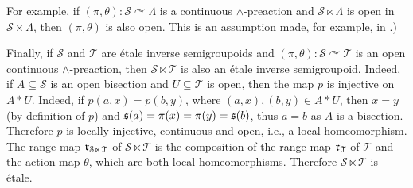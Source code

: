 For example, if $(\pi,\theta)\colon\mathcal{S}\curvearrowright\Lambda$ is a continuous $\land$-preaction and $\mathcal{S}\ltimes\Lambda$ is open in $\mathcal{S}\times\Lambda$, then $(\pi,\theta)$ is also open. This is an assumption made, for example, in \cite{MR2045419}.)

Finally, if $\mathcal{S}$ and $\mathcal{T}$ are étale inverse semigroupoids and $(\pi,\theta)\colon\mathcal{S}\curvearrowright\mathcal{T}$ is an open continuous $\land$-preaction, then $\mathcal{S}\ltimes\mathcal{T}$ is also an étale inverse semigroupoid. Indeed, if $A\subseteq\mathcal{S}$ is an open bisection and $U\subseteq\mathcal{T}$ is open, then the map $p$ is injective on $A\ast U$. Indeed, if $p(a,x)=p(b,y)$, where $(a,x),(b,y)\in A\ast U$, then $x=y$ (by definition of $p$) and $\operatorname{\mathfrak{s}}(a)=\pi(x)=\pi(y)=\operatorname{\mathfrak{s}}(b)$, thus $a=b$ as $A$ is a bisection. Therefore $p$ is locally injective, continuous and open, i.e., a local homeomorphism. The range map $\operatorname{\mathfrak{r}}_{\mathcal{S}\ltimes\mathcal{T}}$ of $\mathcal{S}\ltimes\mathcal{T}$ is the composition of the range map $\operatorname{\mathfrak{r}}_{\mathcal{T}}$ of $\mathcal{T}$ and the action map $\theta$, which are both local homeomorphisms. Therefore $\mathcal{S}\ltimes\mathcal{T}$ is étale.


